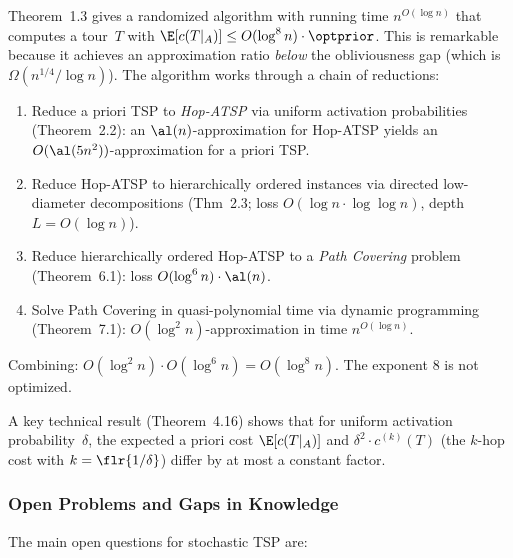 \begin{remark}
    Theorem~1.3 gives a randomized algorithm with running time
    $n^{O(\log n)}$ that computes a tour~$T$ with
    $\E[c(T|_A)] \le O(\log^8 n) \cdot \optprior$.
    This is remarkable because it achieves an approximation ratio
    \emph{below} the obliviousness gap (which is $\Omega(n^{1/4}/\log n)$).
    The algorithm works through a chain of reductions:
    \begin{enumerate}
        \item Reduce a priori TSP to \emph{Hop-ATSP} via uniform
        activation probabilities (Theorem~2.2):
        an $\al(n)$-approx\-imation for Hop-ATSP yields an
        $O(\al(5n^2))$-approx\-imation for a priori TSP.
        \item Reduce Hop-ATSP to hierarchically ordered
        instances via directed low-diameter
        decompositions (Thm~2.3; loss
        $O(\log n \cdot \log\log n)$,
        depth $L = O(\log n)$).
        \item Reduce hierarchically ordered Hop-ATSP to a \emph{Path Covering}
        problem (Theorem~6.1): loss $O(\log^6 n) \cdot \al(n)$.
        \item Solve Path Covering in quasi-polynomial time via dynamic programming (Theorem~7.1): $O(\log^2 n)$-approximation in time $n^{O(\log n)}$.
    \end{enumerate}
    Combining: $O(\log^2 n) \cdot O(\log^6 n) = O(\log^8 n)$. The exponent $8$ is not optimized.

    A key technical result (Theorem~4.16) shows that for uniform activation
    probability~$\delta$, the expected a priori cost $\E[c(T|_A)]$ and
    $\delta^2 \cdot c^{(k)}(T)$ (the $k$-hop cost with $k = \flr{1/\delta}$)
    differ by at most a constant factor.
\end{remark}

\subsubsection{Open Problems and Gaps in Knowledge}

The main open questions for stochastic TSP are:

